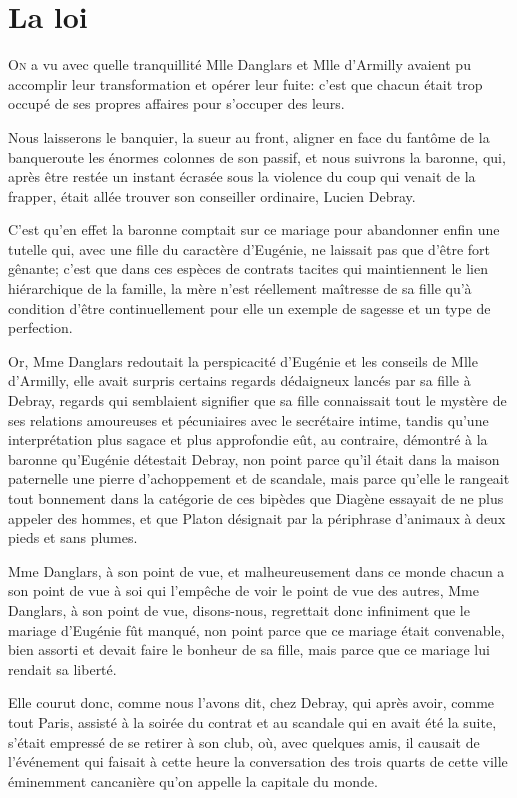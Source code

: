 \chapter{La loi}

\lettrine{O}{n} a vu avec quelle tranquillité Mlle Danglars et Mlle d'Armilly avaient pu accomplir leur transformation et opérer leur fuite: c'est que chacun était trop occupé de ses propres affaires pour s'occuper des leurs. 

Nous laisserons le banquier, la sueur au front, aligner en face du fantôme de la banqueroute les énormes colonnes de son passif, et nous suivrons la baronne, qui, après être restée un instant écrasée sous la violence du coup qui venait de la frapper, était allée trouver son conseiller ordinaire, Lucien Debray. 

C'est qu'en effet la baronne comptait sur ce mariage pour abandonner enfin une tutelle qui, avec une fille du caractère d'Eugénie, ne laissait pas que d'être fort gênante; c'est que dans ces espèces de contrats tacites qui maintiennent le lien hiérarchique de la famille, la mère n'est réellement maîtresse de sa fille qu'à condition d'être continuellement pour elle un exemple de sagesse et un type de perfection. 

Or, Mme Danglars redoutait la perspicacité d'Eugénie et les conseils de Mlle d'Armilly, elle avait surpris certains regards dédaigneux lancés par sa fille à Debray, regards qui semblaient signifier que sa fille connaissait tout le mystère de ses relations amoureuses et pécuniaires avec le secrétaire intime, tandis qu'une interprétation plus sagace et plus approfondie eût, au contraire, démontré à la baronne qu'Eugénie détestait Debray, non point parce qu'il était dans la maison paternelle une pierre d'achoppement et de scandale, mais parce qu'elle le rangeait tout bonnement dans la catégorie de ces bipèdes que Diagène essayait de ne plus appeler des hommes, et que Platon désignait par la périphrase d'animaux à deux pieds et sans plumes. 

Mme Danglars, à son point de vue, et malheureusement dans ce monde chacun a son point de vue à soi qui l'empêche de voir le point de vue des autres, Mme Danglars, à son point de vue, disons-nous, regrettait donc infiniment que le mariage d'Eugénie fût manqué, non point parce que ce mariage était convenable, bien assorti et devait faire le bonheur de sa fille, mais parce que ce mariage lui rendait sa liberté. 

Elle courut donc, comme nous l'avons dit, chez Debray, qui après avoir, comme tout Paris, assisté à la soirée du contrat et au scandale qui en avait été la suite, s'était empressé de se retirer à son club, où, avec quelques amis, il causait de l'événement qui faisait à cette heure la conversation des trois quarts de cette ville éminemment cancanière qu'on appelle la capitale du monde. 

